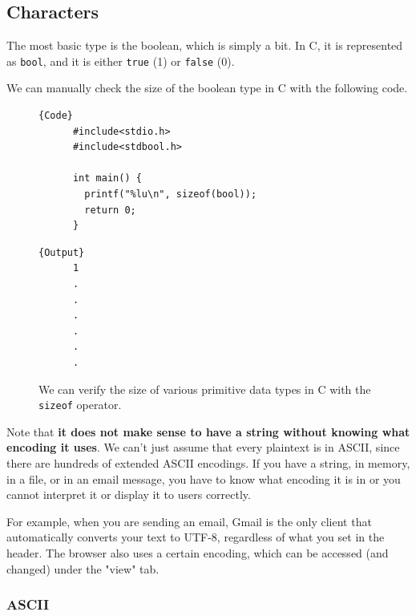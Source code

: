 \subsection{Characters}

  \begin{definition}[Booleans in C]
    \label{def:booleans-in-c}
    The most basic type is the boolean, which is simply a bit. In C, it is represented as \texttt{bool}, and it is either \texttt{true} (1) or \texttt{false} (0). 
  \end{definition}

  We can manually check the size of the boolean type in C with the following code. 

  \begin{figure}[H]
    \centering 
    \noindent\begin{minipage}{.5\textwidth}
    \begin{lstlisting}[firstnumber=1]{Code}
      #include<stdio.h>
      #include<stdbool.h>

      int main() {
        printf("%lu\n", sizeof(bool)); 
        return 0; 
      }
    \end{lstlisting}
    \end{minipage}
    \hfill
    \begin{minipage}{.49\textwidth}
    \begin{lstlisting}[]{Output}
      1
      .
      .
      .
      .
      .
      .
    \end{lstlisting}
    \end{minipage}
    \caption{We can verify the size of various primitive data types in C with the \texttt{sizeof} operator.} 
    \label{fig:boolean_size}
  \end{figure}

  Note that \textbf{it does not make sense to have a string without knowing what encoding it uses}. We can't just assume that every plaintext is in ASCII, since there are hundreds of extended ASCII encodings. If you have a string, in memory, in a file, or in an email message, you have to know what encoding it is in or you cannot interpret it or display it to users correctly. 

  For example, when you are sending an email, Gmail is the only client that automatically converts your text to UTF-8, regardless of what you set in the header. The browser also uses a certain encoding, which can be accessed (and changed) under the "view" tab. 

  \subsubsection{ASCII}

